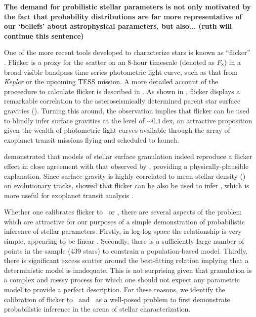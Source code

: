 \textbf{
The demand for probilistic stellar parameters is not only motivated by the fact
that probability distributions are far more representative of our `beliefs'
about astrophysical parameters, but also... (ruth will continue this sentence)
}



One of the more recent tools developed to characterize stars is known as
``flicker'' \citep{bastien:2013}. Flicker is a proxy for the scatter on an
8-hour timescale (denoted as $F_8$) in a broad visible bandpass time series
photometric light curve, such as that from \textit{Kepler} or the upcoming TESS
mission. A more detailed account of the proceedure to calculate flicker is
described in \citet{bastien:2013}. As shown in \citet{bastien:2013}, flicker
displays a remarkable correlation to the asteroseismically determined parent
star surface gravities (\logg). Turning this around, the observation implies
that flicker can be used to blindly infer surface gravities at the level of
$\sim0.1$\,dex, an attractive proposition given the wealth of photometric light
curves available through the array of exoplanet transit missions flying and
scheduled to launch.

\citet{cranmer:2014} demonstrated that models of stellar surface granulation 
indeed reproduce a flicker effect in close agreement with that observed by
\citet{bastien:2013}, providing a physically-plausible explanation. Since
surface gravity is highly correlated to mean stellar density (\rhostar) on
evolutionary tracks, \citet{kipping:2014} showed that flicker can be also
be used to infer \rhostar, which is more useful for exoplanet transit
analysis \citep{seager:2003}.

Whether one calibrates flicker to \logg\ or \rhostar, there are several aspects
of the problem which are attractive for our purposes of a simple demonstration
of probabilistic inference of stellar parameters. Firstly, in log-log space the
relationship is very simple, appearing to be linear \citep{kipping:2014}. 
Secondly, there is a sufficiently large number of points in the sample (439 
stars) to constrain a population-based model. Thirdly, there is significant 
excess scatter around the best-fitting relation implying that a deterministic 
model is inadequate. This is not surprising given that granulation is a complex 
and messy process for which one should not expect any parametric model to 
provide a perfect description. For these reasons, we identify the calibration of 
flicker to \logg\ and \rhostar\ as a well-posed problem to first demonstrate 
probabilistic inference in the arena of stellar characterization.

